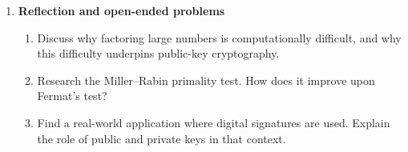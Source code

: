 \begin{enumerate}
\item \textbf{Reflection and open-ended problems}
  \begin{enumerate}
    \item Discuss why factoring large numbers is computationally difficult, and why this difficulty 
          underpins public-key cryptography.
    \item Research the Miller--Rabin primality test. How does it improve upon Fermat’s test?
    \item Find a real-world application where digital signatures are used. 
          Explain the role of public and private keys in that context.
  \end{enumerate}

\end{enumerate}
